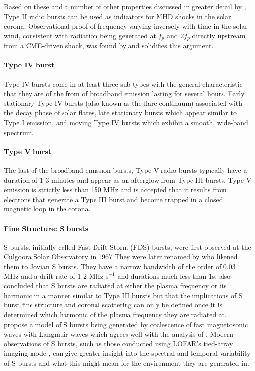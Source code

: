 Based on these and a number of other properties discussed in greater detail by \cite{NelsonandMelrose1985}, Type II radio bursts can be used as indicators for MHD shocks in the solar corona. Observational proof of frequency varying inversely with time in the solar wind, consistent with radiation being generated at $f_p$ and $2f_p$ directly upstream from a CME-driven shock, was found by \cite{Reiner1997} and solidifies this argument.

\paragraph{Type IV burst}
Type IV bursts come in at least three sub-types with the general characteristic that they are of the from of broadband emission lasting for several hours. Early stationary Type IV bursts (also known as the flare continuum) associated with the decay phase of solar flares, late stationary bursts which appear similar to Type I emission, and moving Type IV bursts which exhibit a smooth, wide-band spectrum.
\paragraph{Type V burst}
The last of the broadband emission bursts, Type V radio bursts typically have a duration of 1-3 minutes and appear as an afterglow from Type III bursts. Type V emission is strictly less than 150 MHz and is accepted that it results from electrons that generate a Type III burst and become trapped in a closed magnetic loop in the corona.

\paragraph{Fine Structure: S bursts} 
S bursts, initially called Fast Drift Storm (FDS) bursts, were first observed at the Culgoora Solar Observatory in 1967 \citep{Ellis1969} They were later renamed by \cite{McConnell1980} who likened them to Jovian S bursts. They have a narrow bandwidth of the order of 0.03 MHz and a drift rate of 1-2 MHz s$^{-1}$ and durations much less than 1s. \cite{McConnell1980} also concluded that S bursts are radiated at either the plasma frequency or its harmonic in a manner similar to Type III bursts but that the implications of S burst fine structure and coronal scattering can only be defined once it is determined which harmonic of the plasma frequency they are radiated at. \cite{Melnik2010} propose a model of S bursts being generated by coalescence of fast magnetosonic waves with Langmuir waves which agrees well with the analysis of \cite{Clarke2019}. Modern observations of S bursts, such as those conducted using LOFAR's tied-array imaging mode \citep{Morosan2015}, can give greater insight into the spectral and temporal variability of S bursts and what this might mean for the environment they are generated in.

